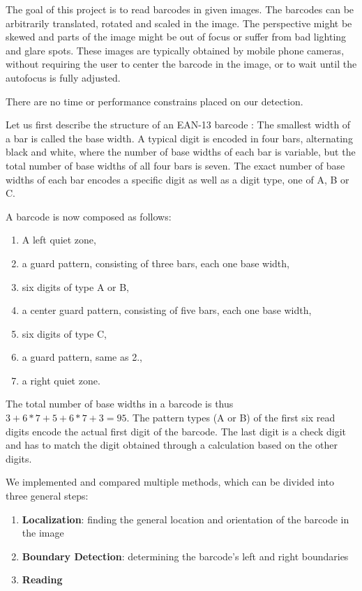 The goal of this project is to read barcodes in given images. The barcodes can
be arbitrarily translated, rotated and scaled in the image. The perspective
might be skewed and parts of the image might be out of focus or suffer from bad
lighting and glare spots. These images are typically obtained by mobile phone
cameras, without requiring the user to center the barcode in the image, or to
wait until the autofocus is fully adjusted.

There are no time or performance constrains placed on our detection.

Let us first describe the structure of an EAN-13 barcode \cite{GS12017}:
The smallest width of a bar is called the base width. A typical digit is encoded
in four bars, alternating black and white, where the number of base widths
of each bar is variable, but the total number of base widths of all four bars is seven.
The exact number of base widths of each bar encodes a specific digit as well as a digit
type, one of A, B or C.

A barcode is now composed as follows:
\begin{enumerate}
\item A left quiet zone,
\item a guard pattern, consisting of three bars, each one base width,
\item six digits of type A or B,
\item a center guard pattern, consisting of five bars, each one base width,
\item six digits of type C,
\item a guard pattern, same as 2.,
\item a right quiet zone.
\end{enumerate}

The total number of base widths in a barcode is thus $3 + 6*7 + 5 + 6*7 + 3=95$.
The pattern types (A or B) of the first six read digits encode the actual first
digit of the barcode. The last digit is a check digit and has to match the digit
obtained through a calculation based on the other digits.

We implemented and compared multiple methods, which can be divided into
three general steps:
\begin{enumerate}
\item \textbf{Localization}: finding the general location and orientation of the barcode
  in the image
\item \textbf{Boundary Detection}: determining the barcode's left and right boundaries
\item \textbf{Reading}
\end{enumerate}

